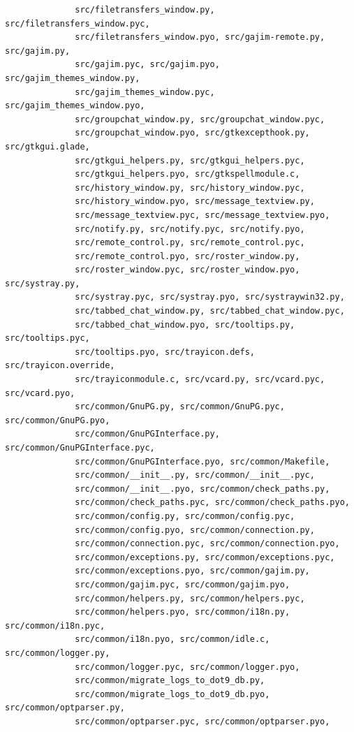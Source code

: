 \documentclass[a4paper]{article}
\begin{document}
\begin{verbatim}
              src/filetransfers_window.py, src/filetransfers_window.pyc,
              src/filetransfers_window.pyo, src/gajim-remote.py, src/gajim.py,
              src/gajim.pyc, src/gajim.pyo, src/gajim_themes_window.py,
              src/gajim_themes_window.pyc, src/gajim_themes_window.pyo,
              src/groupchat_window.py, src/groupchat_window.pyc,
              src/groupchat_window.pyo, src/gtkexcepthook.py, src/gtkgui.glade,
              src/gtkgui_helpers.py, src/gtkgui_helpers.pyc,
              src/gtkgui_helpers.pyo, src/gtkspellmodule.c,
              src/history_window.py, src/history_window.pyc,
              src/history_window.pyo, src/message_textview.py,
              src/message_textview.pyc, src/message_textview.pyo,
              src/notify.py, src/notify.pyc, src/notify.pyo,
              src/remote_control.py, src/remote_control.pyc,
              src/remote_control.pyo, src/roster_window.py,
              src/roster_window.pyc, src/roster_window.pyo, src/systray.py,
              src/systray.pyc, src/systray.pyo, src/systraywin32.py,
              src/tabbed_chat_window.py, src/tabbed_chat_window.pyc,
              src/tabbed_chat_window.pyo, src/tooltips.py, src/tooltips.pyc,
              src/tooltips.pyo, src/trayicon.defs, src/trayicon.override,
              src/trayiconmodule.c, src/vcard.py, src/vcard.pyc, src/vcard.pyo,
              src/common/GnuPG.py, src/common/GnuPG.pyc, src/common/GnuPG.pyo,
              src/common/GnuPGInterface.py, src/common/GnuPGInterface.pyc,
              src/common/GnuPGInterface.pyo, src/common/Makefile,
              src/common/__init__.py, src/common/__init__.pyc,
              src/common/__init__.pyo, src/common/check_paths.py,
              src/common/check_paths.pyc, src/common/check_paths.pyo,
              src/common/config.py, src/common/config.pyc,
              src/common/config.pyo, src/common/connection.py,
              src/common/connection.pyc, src/common/connection.pyo,
              src/common/exceptions.py, src/common/exceptions.pyc,
              src/common/exceptions.pyo, src/common/gajim.py,
              src/common/gajim.pyc, src/common/gajim.pyo,
              src/common/helpers.py, src/common/helpers.pyc,
              src/common/helpers.pyo, src/common/i18n.py, src/common/i18n.pyc,
              src/common/i18n.pyo, src/common/idle.c, src/common/logger.py,
              src/common/logger.pyc, src/common/logger.pyo,
              src/common/migrate_logs_to_dot9_db.py,
              src/common/migrate_logs_to_dot9_db.pyo, src/common/optparser.py,
              src/common/optparser.pyc, src/common/optparser.pyo,

\end{verbatim}
\end{document}
